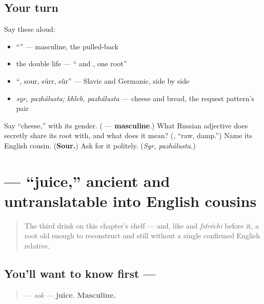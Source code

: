 \subsection*{Your turn}
Say these aloud:

\begin{itemize}
\raggedright
  \item \textquotedblleft{}\textquotedblright{} — masculine, the pulled-back 
  \item the double life — \textquotedblleft{} and , one root\textquotedblright{}
  \item \textquotedblleft{}, sour, súrr, sûr\textquotedblright{} — Slavic and Germanic, side by side
  \item \emph{syr, pazhálusta; khleb, pazhálusta} — cheese and bread, the request pattern's pair
\end{itemize}

\begin{tcolorbox}[breakable,colback=teal!4,colframe=teal!35!black,title={Before you move on}]
Say \textquotedblleft{}cheese,\textquotedblright{} with its gender. (\textbf{} — \textbf{masculine}.) What Russian adjective does \emph{} secretly share its root with, and what does it mean? (\textbf{}, \textquotedblleft{}raw, damp.\textquotedblright{}) Name its English cousin. (\textbf{Sour.}) Ask for it politely. (\emph{Syr, pazhálusta.})
\end{tcolorbox}
\section[\texorpdfstring{\ru{сок} (sok)}{сок (sok)}]{ — \textquotedblleft{}juice,\textquotedblright{} ancient and untranslatable into English cousins}

\label{lesson:RU-C13-sok}



\begin{quote}
The third drink on this chapter's shelf — and, like \emph{} and \emph{fstréchi} before it, a root old enough to reconstruct and still without a single confirmed English relative.
\end{quote}

\subsection*{You'll want to know first — }
\begin{quote}
\textbf{} — \emph{sok} — \textbf{juice}. \textbf{Masculine.}
\end{quote}

